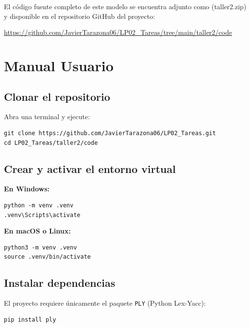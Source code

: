 \documentclass{article}
\begin{document}
El código fuente completo de este modelo se encuentra adjunto como 
(taller2.zip)
y disponible en el repositorio GitHub del proyecto:

\begin{center}
\url{https://github.com/JavierTarazona06/LP02_Tareas/tree/main/taller2/code}
\end{center}


\section{Manual Usuario}\label{sec:man_u}

\subsection{Clonar el repositorio}

Abra una terminal y ejecute:

\begin{verbatim}
git clone https://github.com/JavierTarazona06/LP02_Tareas.git
cd LP02_Tareas/taller2/code
\end{verbatim}

\subsection{Crear y activar el entorno virtual}

\textbf{En Windows:}
\begin{verbatim}
python -m venv .venv
.venv\Scripts\activate
\end{verbatim}

\textbf{En macOS o Linux:}
\begin{verbatim}
python3 -m venv .venv
source .venv/bin/activate
\end{verbatim}

\subsection{Instalar dependencias}
El proyecto requiere únicamente el paquete \texttt{PLY} (Python Lex-Yacc):

\begin{verbatim}
pip install ply
\end{verbatim}
\end{document}
